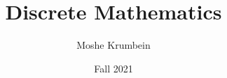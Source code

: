 
\usepackage{subfiles}

\title{Discrete Mathematics}
\def \thecoursenum {80181}
\def \theinstructor {Dr. Noa Nitzan}
\author{Moshe Krumbein}
\date{Fall 2021}





\setcounter{tocdepth}{2}
\tableofcontents
\cleardoublepage















